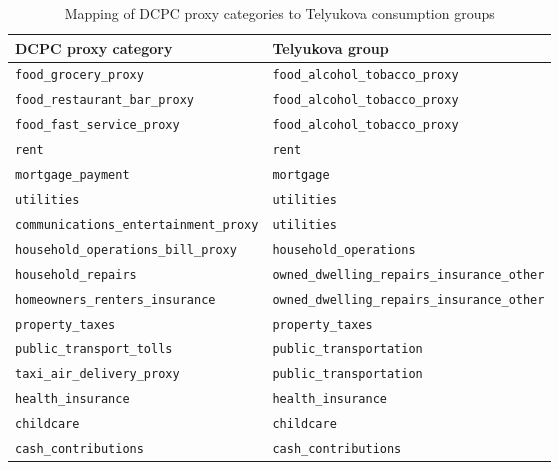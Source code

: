 \documentclass[11pt]{article}
\newcommand{\code}[1]{\nolinkurl{#1}}
\begin{document}
\begin{table}[htbp]
	\centering
	\small
	\setlength{\tabcolsep}{8pt}
	\renewcommand{\arraystretch}{1.2}
	
	\caption{Mapping of DCPC proxy categories to Telyukova consumption groups}
	\label{tab:dcpc-telyukova-crosswalk}
	
	\begin{tabular}{
			>{\RaggedRight\arraybackslash}p{}
			>{\RaggedRight\arraybackslash}p{}
		}
		\toprule
		DCPC proxy category & Telyukova group \\
		\midrule
		
		\code{food_grocery_proxy}
		& \code{food_alcohol_tobacco_proxy} \\
		
		\code{food_restaurant_bar_proxy}
		& \code{food_alcohol_tobacco_proxy} \\
		
		\code{food_fast_service_proxy}
		& \code{food_alcohol_tobacco_proxy} \\
		
		\code{rent}
		& \code{rent} \\
		
		\code{mortgage_payment}
		& \code{mortgage} \\
		
		\code{utilities}
		& \code{utilities} \\
		
		\code{communications_entertainment_proxy}
		& \code{utilities} \\
		
		\code{household_operations_bill_proxy}
		& \code{household_operations} \\
		
		\code{household_repairs}
		& \code{owned_dwelling_repairs_insurance_other} \\
		
		\code{homeowners_renters_insurance}
		& \code{owned_dwelling_repairs_insurance_other} \\
		
		\code{property_taxes}
		& \code{property_taxes} \\
		
		\code{public_transport_tolls}
		& \code{public_transportation} \\
		
		\code{taxi_air_delivery_proxy}
		& \code{public_transportation} \\
		
		\code{health_insurance}
		& \code{health_insurance} \\
		
		\code{childcare}
		& \code{childcare} \\
		
		\code{cash_contributions}
		& \code{cash_contributions} \\
		
		\bottomrule
	\end{tabular}
\end{table}
\end{document}
